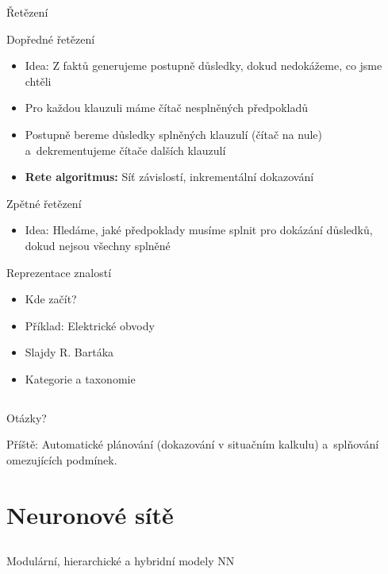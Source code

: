 \documentclass{beamer}
\begin{document}
\begin{frame}{Řetězení}
\begin{block}{Dopředné řetězení}
\begin{itemize}
\item Idea: Z faktů generujeme postupně důsledky, dokud nedokážeme, co jsme chtěli
\item Pro každou klauzuli máme čítač nesplněných předpokladů
\item Postupně bereme důsledky splněných klauzulí (čítač na nule) a~dekrementujeme čítače dalších klauzulí
\item {\bf Rete algoritmus:} Síť závislostí, inkrementální dokazování
\end{itemize}
\end{block}

\begin{block}{Zpětné řetězení}
\begin{itemize}
\item Idea: Hledáme, jaké předpoklady musíme splnit pro dokázání důsledků, dokud nejsou všechny splněné
\end{itemize}
\end{block}
\end{frame}

\begin{frame}{Reprezentace znalostí}
\begin{itemize}
\item Kde začít?
\item Příklad: Elektrické obvody
\item Slajdy R. Bartáka
\item Kategorie a taxonomie
\end{itemize}
\end{frame}

\subsection{}
\begin{frame}{Otázky?}
\begin{center}
Příště: Automatické plánování (dokazování v situačním kalkulu) a~splňování omezujících podmínek.
\end{center}
\end{frame}

\section{Neuronové sítě}

\subsection{}
\begin{frame}{Modulární, hierarchické a hybridní modely NN}
\end{frame}
\end{document}

